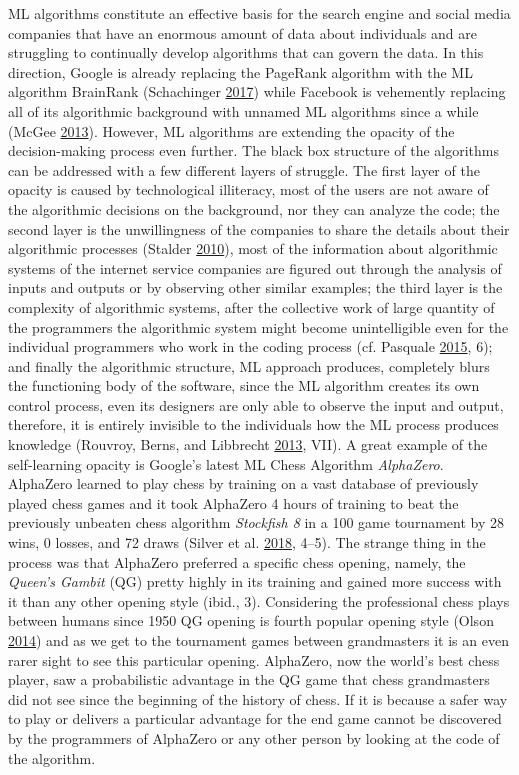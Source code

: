 \documentclass[12pt,twoside]{report}
\begin{document}
ML algorithms constitute an effective basis for the search engine and social media companies that have an enormous amount of data about individuals and are struggling to continually develop algorithms that can govern the data. In this direction, Google is already replacing the PageRank algorithm with the ML algorithm BrainRank (Schachinger \protect\hyperlink{ref-Schachinger2017}{2017}) while Facebook is vehemently replacing all of its algorithmic background with unnamed ML algorithms since a while (McGee \protect\hyperlink{ref-McGee2013}{2013}). However, ML algorithms are extending the opacity of the decision-making process even further. The black box structure of the algorithms can be addressed with a few different layers of struggle. The first layer of the opacity is caused by technological illiteracy, most of the users are not aware of the algorithmic decisions on the background, nor they can analyze the code; the second layer is the unwillingness of the companies to share the details about their algorithmic processes (Stalder \protect\hyperlink{ref-Stalder2009}{2010}), most of the information about algorithmic systems of the internet service companies are figured out through the analysis of inputs and outputs or by observing other similar examples; the third layer is the complexity of algorithmic systems, after the collective work of large quantity of the programmers the algorithmic system might become unintelligible even for the individual programmers who work in the coding process (cf. Pasquale \protect\hyperlink{ref-Pasquale2015}{2015}, 6); and finally the algorithmic structure, ML approach produces, completely blurs the functioning body of the software, since the ML algorithm creates its own control process, even its designers are only able to observe the input and output, therefore, it is entirely invisible to the individuals how the ML process produces knowledge (Rouvroy, Berns, and Libbrecht \protect\hyperlink{ref-Rouvroy2013}{2013}, VII). A great example of the self-learning opacity is Google's latest ML Chess Algorithm \emph{AlphaZero}. AlphaZero learned to play chess by training on a vast database of previously played chess games and it took AlphaZero 4 hours of training to beat the previously unbeaten chess algorithm \emph{Stockfish 8} in a 100 game tournament by 28 wins, 0 losses, and 72 draws (Silver et al. \protect\hyperlink{ref-Silver2018}{2018}, 4--5). The strange thing in the process was that AlphaZero preferred a specific chess opening, namely, the \emph{Queen's Gambit} (QG) pretty highly in its training and gained more success with it than any other opening style (ibid., 3). Considering the professional chess plays between humans since 1950 QG opening is fourth popular opening style (Olson \protect\hyperlink{ref-Olson2014}{2014}) and as we get to the tournament games between grandmasters it is an even rarer sight to see this particular opening. AlphaZero, now the world's best chess player, saw a probabilistic advantage in the QG game that chess grandmasters did not see since the beginning of the history of chess. If it is because a safer way to play or delivers a particular advantage for the end game cannot be discovered by the programmers of AlphaZero or any other person by looking at the code of the algorithm.
\end{document}
